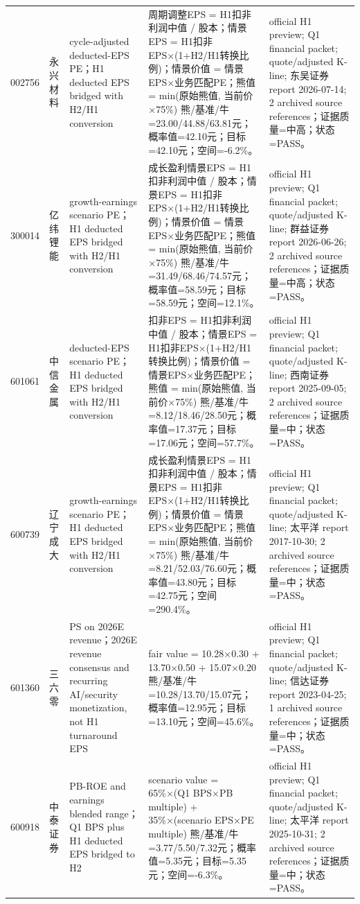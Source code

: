\begin{longtable}{L{0.85cm}L{1.55cm}L{2.25cm}L{6.0cm}L{4.0cm}}
002756 & 永兴材料 & cycle-adjusted deducted-EPS PE；H1 deducted EPS bridged with H2/H1 conversion & 周期调整EPS = H1扣非利润中值 / 股本；情景EPS = H1扣非EPS×(1+H2/H1转换比例)；情景价值 = 情景EPS×业务匹配PE；熊值 = min(原始熊值, 当前价×75\%) 熊/基准/牛=23.00/44.88/63.81元；概率值=42.10元；目标=42.10元；空间=-6.2\%。 & official H1 preview; Q1 financial packet; quote/adjusted K-line; 东吴证券 report 2026-07-14; 2 archived source references；证据质量=中高；状态=PASS。 \\
300014 & 亿纬锂能 & growth-earnings scenario PE；H1 deducted EPS bridged with H2/H1 conversion & 成长盈利情景EPS = H1扣非利润中值 / 股本；情景EPS = H1扣非EPS×(1+H2/H1转换比例)；情景价值 = 情景EPS×业务匹配PE；熊值 = min(原始熊值, 当前价×75\%) 熊/基准/牛=31.49/68.46/74.57元；概率值=58.59元；目标=58.59元；空间=12.1\%。 & official H1 preview; Q1 financial packet; quote/adjusted K-line; 群益证券 report 2026-06-26; 2 archived source references；证据质量=中高；状态=PASS。 \\
601061 & 中信金属 & deducted-EPS scenario PE；H1 deducted EPS bridged with H2/H1 conversion & 扣非EPS = H1扣非利润中值 / 股本；情景EPS = H1扣非EPS×(1+H2/H1转换比例)；情景价值 = 情景EPS×业务匹配PE；熊值 = min(原始熊值, 当前价×75\%) 熊/基准/牛=8.12/18.46/28.50元；概率值=17.37元；目标=17.06元；空间=57.7\%。 & official H1 preview; Q1 financial packet; quote/adjusted K-line; 西南证券 report 2025-09-05; 2 archived source references；证据质量=中；状态=PASS。 \\
600739 & 辽宁成大 & growth-earnings scenario PE；H1 deducted EPS bridged with H2/H1 conversion & 成长盈利情景EPS = H1扣非利润中值 / 股本；情景EPS = H1扣非EPS×(1+H2/H1转换比例)；情景价值 = 情景EPS×业务匹配PE；熊值 = min(原始熊值, 当前价×75\%) 熊/基准/牛=8.21/52.03/76.60元；概率值=43.80元；目标=42.75元；空间=290.4\%。 & official H1 preview; Q1 financial packet; quote/adjusted K-line; 太平洋 report 2017-10-30; 2 archived source references；证据质量=中；状态=PASS。 \\
601360 & 三六零 & PS on 2026E revenue；2026E revenue consensus and recurring AI/security monetization, not H1 turnaround EPS & fair value = 10.28×0.30 + 13.70×0.50 + 15.07×0.20 熊/基准/牛=10.28/13.70/15.07元；概率值=12.95元；目标=13.10元；空间=45.6\%。 & official H1 preview; Q1 financial packet; quote/adjusted K-line; 信达证券 report 2023-04-25; 1 archived source references；证据质量=中；状态=PASS。 \\
600918 & 中泰证券 & PB-ROE and earnings blended range；Q1 BPS plus H1 deducted EPS bridged to H2 & scenario value = 65\%×(Q1 BPS×PB multiple) + 35\%×(scenario EPS×PE multiple) 熊/基准/牛=3.77/5.50/7.32元；概率值=5.35元；目标=5.35元；空间=-6.3\%。 & official H1 preview; Q1 financial packet; quote/adjusted K-line; 太平洋 report 2025-10-31; 2 archived source references；证据质量=中；状态=PASS。 \\

\end{longtable}
